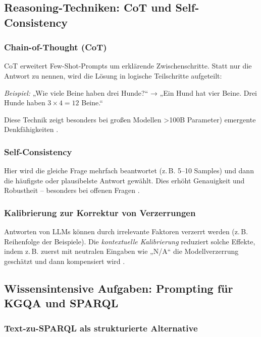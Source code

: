 \subsection{Reasoning-Techniken: CoT und Self-Consistency}

\subsubsection{Chain-of-Thought (CoT)}

CoT erweitert Few-Shot-Prompts um erklärende Zwischenschritte. Statt nur die Antwort zu nennen, wird die Lösung in logische Teilschritte aufgeteilt:

\emph{Beispiel:}  
„Wie viele Beine haben drei Hunde?“  
→ „Ein Hund hat vier Beine. Drei Hunde haben \(3 \times 4 = 12\) Beine.“

Diese Technik zeigt besonders bei großen Modellen >100B Parameter) emergente Denkfähigkeiten \cite{wei2022cot}.

\subsubsection{Self-Consistency}

Hier wird die gleiche Frage mehrfach beantwortet (z.\,B. 5–10 Samples) und dann die häufigste oder plausibelste Antwort gewählt. Dies erhöht Genauigkeit und Robustheit – besonders bei offenen Fragen \cite{wang2022selfconsistency}.

\subsubsection{Kalibrierung zur Korrektur von Verzerrungen}

Antworten von LLMs können durch irrelevante Faktoren verzerrt werden (z.\,B. Reihenfolge der Beispiele). Die \emph{kontextuelle Kalibrierung} reduziert solche Effekte, indem z.\,B. zuerst mit neutralen Eingaben wie „N/A“ die Modellverzerrung geschätzt und dann kompensiert wird \cite{zhao2021calibrate}.

\subsection{Wissensintensive Aufgaben: Prompting für KGQA und SPARQL}

\subsubsection{Text-zu-SPARQL als strukturierte Alternative}

